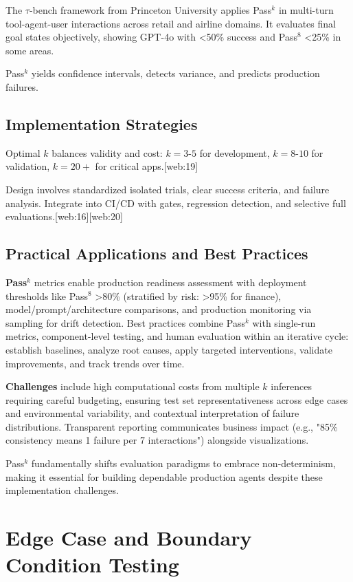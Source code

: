\begin{TNtwocol}
The $\tau$-bench framework from Princeton University applies Pass$^k$ in multi-turn tool-agent-user interactions across retail and airline domains. It evaluates final goal states objectively, showing GPT-4o with <50\% success and Pass$^8$ <25\% in some areas.

Pass$^k$ yields confidence intervals, detects variance, and predicts production failures.

\subsection*{Implementation Strategies}

Optimal $k$ balances validity and cost: $k=3$-$5$ for development, $k=8$-$10$ for validation, $k=20+$ for critical apps.[web:19]

Design involves standardized isolated trials, clear success criteria, and failure analysis. Integrate into CI/CD with gates, regression detection, and selective full evaluations.[web:16][web:20]

\subsection*{Practical Applications and Best Practices}

\textbf{Pass$^k$} metrics enable production readiness assessment with deployment thresholds like Pass$^8$ >80\% (stratified by risk: >95\% for finance), model/prompt/architecture comparisons, and production monitoring via sampling for drift detection. Best practices combine Pass$^k$ with single-run metrics, component-level testing, and human evaluation within an iterative cycle: establish baselines, analyze root causes, apply targeted interventions, validate improvements, and track trends over time.

\textbf{Challenges} include high computational costs from multiple $k$ inferences requiring careful budgeting, ensuring test set representativeness across edge cases and environmental variability, and contextual interpretation of failure distributions. Transparent reporting communicates business impact (e.g., "85\% consistency means 1 failure per 7 interactions") alongside visualizations.

Pass$^k$ fundamentally shifts evaluation paradigms to embrace non-determinism, making it essential for building dependable production agents despite these implementation challenges.

\section{Edge Case and Boundary Condition Testing}
\label{sec:edge-case-boundary-testing}


\end{TNtwocol}
